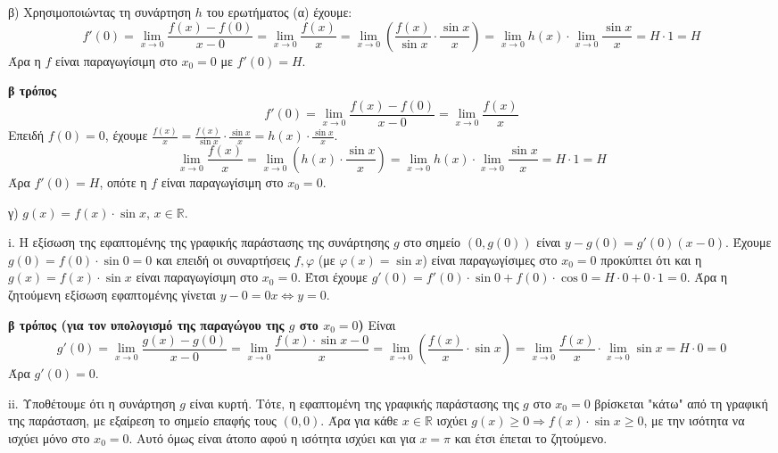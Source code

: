 \begin{alist}
    \item[β)] Χρησιμοποιώντας τη συνάρτηση $h$ του ερωτήματος (α) έχουμε:
    \[ f'(0) = \lim_{x \to 0} \frac{f(x) - f(0)}{x - 0} = \lim_{x \to 0} \frac{f(x)}{x} = \lim_{x \to 0} \left( \frac{f(x)}{\sin x} \cdot \frac{\sin x}{x} \right) = \lim_{x \to 0} h(x) \cdot \lim_{x \to 0} \frac{\sin x}{x} = H \cdot 1 = H \]
    Άρα η $f$ είναι παραγωγίσιμη στο $x_0 = 0$ με $f'(0) = H$.

    \textbf{β τρόπος}
    \[ f'(0) = \lim_{x \to 0} \frac{f(x) - f(0)}{x - 0} = \lim_{x \to 0} \frac{f(x)}{x} \]
    Επειδή $f(0) = 0$, έχουμε $\frac{f(x)}{x} = \frac{f(x)}{\sin x} \cdot \frac{\sin x}{x} = h(x) \cdot \frac{\sin x}{x}$.
    \[ \lim_{x \to 0} \frac{f(x)}{x} = \lim_{x \to 0} \left( h(x) \cdot \frac{\sin x}{x} \right) = \lim_{x \to 0} h(x) \cdot \lim_{x \to 0} \frac{\sin x}{x} = H \cdot 1 = H \]
    Άρα $f'(0) = H$, οπότε η $f$ είναι παραγωγίσιμη στο $x_0 = 0$.

    \item[γ)] $g(x) = f(x) \cdot \sin x$, $x \in \mathbb{R}$.
    \begin{rlist}
        \item[i.] Η εξίσωση της εφαπτομένης της γραφικής παράστασης της συνάρτησης $g$ στο σημείο $(0, g(0))$ είναι $y - g(0) = g'(0)(x - 0)$. Έχουμε $g(0) = f(0) \cdot \sin 0 = 0$ και επειδή οι συναρτήσεις $f, \varphi$ (με $\varphi(x) = \sin x$) είναι παραγωγίσιμες στο $x_0 = 0$ προκύπτει ότι και η $g(x) = f(x) \cdot \sin x$ είναι παραγωγίσιμη στο $x_0 = 0$.
        Έτσι έχουμε $g'(0) = f'(0) \cdot \sin 0 + f(0) \cdot \cos 0 = H \cdot 0 + 0 \cdot 1 = 0$.
        Άρα η ζητούμενη εξίσωση εφαπτομένης γίνεται $y - 0 = 0x \Leftrightarrow y = 0$.

        \textbf{β τρόπος (για τον υπολογισμό της παραγώγου της $g$ στο $x_0 = 0$)} Είναι
        \[ g'(0) = \lim_{x \to 0} \frac{g(x) - g(0)}{x - 0} = \lim_{x \to 0} \frac{f(x) \cdot \sin x - 0}{x} = \lim_{x \to 0} \left( \frac{f(x)}{x} \cdot \sin x \right) = \lim_{x \to 0} \frac{f(x)}{x} \cdot \lim_{x \to 0} \sin x = H \cdot 0 = 0 \]
        Άρα $g'(0) = 0$.

        \item[ii.] Υποθέτουμε ότι η συνάρτηση $g$ είναι κυρτή. Τότε, η εφαπτομένη της γραφικής παράστασης της $g$ στο $x_0 = 0$ βρίσκεται "κάτω" από τη γραφική της παράσταση, με εξαίρεση το σημείο επαφής τους $(0,0)$. Άρα για κάθε $x \in \mathbb{R}$ ισχύει $g(x) \ge 0 \Rightarrow f(x) \cdot \sin x \ge 0$, με την ισότητα να ισχύει μόνο στο $x_0 = 0$. Αυτό όμως είναι άτοπο αφού η ισότητα ισχύει και για $x = \pi$ και έτσι έπεται το ζητούμενο.
    \end{rlist}
\end{alist}